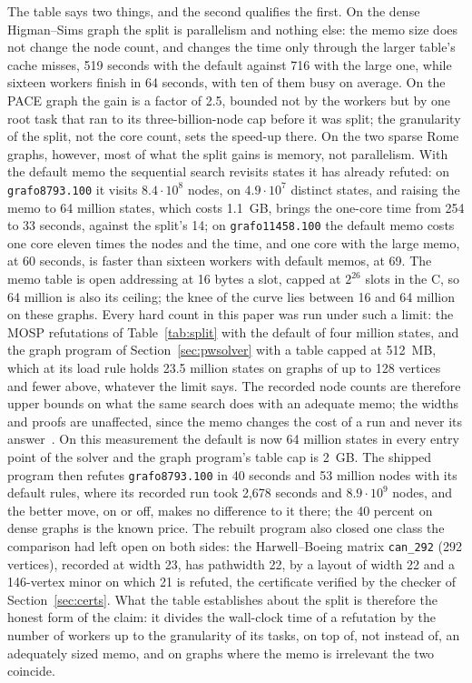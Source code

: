 The table says two things, and the second qualifies the first. On the dense
Higman--Sims graph the split is parallelism and nothing else: the memo size
does not change the node count, and changes the time only through the larger
table's cache misses, 519 seconds with the default against 716 with the large
one, while sixteen workers finish in 64 seconds, with ten of them busy on
average. On
the PACE graph the gain is a factor of 2.5, bounded not by the workers but by
one root task that ran to its three-billion-node cap before it was split; the
granularity of the split, not the core count, sets the speed-up there. On the
two sparse Rome graphs, however, most of what the split gains is memory, not
parallelism. With the default memo the sequential search revisits states it
has already refuted: on \texttt{grafo8793.100} it visits $8.4\cdot10^{8}$
nodes, on $4.9\cdot10^{7}$ distinct states, and raising the memo to 64
million states, which costs 1.1~GB, brings the one-core time from 254 to 33
seconds, against the split's 14; on \texttt{grafo11458.100} the default memo costs one core eleven times the
nodes and the time, and one core with the large memo, at 60 seconds, is faster
than sixteen workers with default memos, at 69. The memo table
is open addressing at 16 bytes a slot, capped at $2^{26}$ slots in the C, so
64 million is also its ceiling; the knee of the curve lies between 16 and 64
million on these graphs. Every hard count in this paper was run under such a limit: the MOSP
refutations of Table~\ref{tab:split} with the default of four million states,
and the graph program of Section~\ref{sec:pwsolver} with a table capped at
512~MB, which at its load rule holds 23.5 million states on graphs of up to
128 vertices and fewer above, whatever the limit says. The recorded node
counts are therefore upper bounds on what the same search does with an
adequate memo; the widths and proofs are unaffected, since the memo changes
the cost of a run and never its answer~. On this measurement
the default is now 64 million states in every entry point of the solver and
the graph program's table cap is 2~GB. The shipped program then refutes
\texttt{grafo8793.100} in 40 seconds and 53 million nodes with its default
rules, where its recorded run took 2,678 seconds and $8.9\cdot10^{9}$
nodes, and the better move, on or off, makes no difference to it there; the
40 percent on dense graphs is the known price. The rebuilt program also
closed one class the comparison had left open on both sides: the
Harwell--Boeing matrix \texttt{can\_292} (292 vertices), recorded at width 23,
has pathwidth 22, by a layout of width 22 and a 146-vertex minor on which 21
is refuted, the certificate verified by the checker of Section~\ref{sec:certs}.
What the table establishes about the split is therefore the honest form of the
claim: it divides the wall-clock time of a refutation by the number of
workers up to the granularity of its tasks, on top of, not instead of, an
adequately sized memo, and on graphs where the memo is irrelevant the two
coincide.

